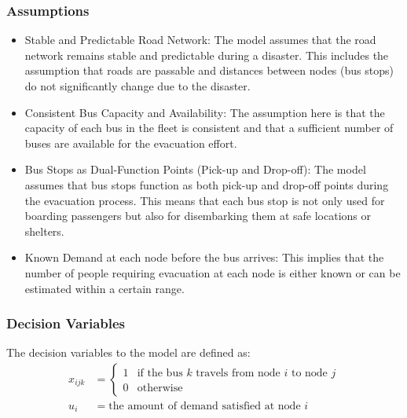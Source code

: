 \documentclass[12pt]{article}
\begin{document}
\subsubsection{Assumptions}
\begin{itemize}
    \item Stable and Predictable Road Network: The model assumes that the road network remains stable and predictable during a disaster. This includes the assumption that roads are passable and distances between nodes (bus stops) do not significantly change due to the disaster.
    \item Consistent Bus Capacity and Availability: The assumption here is that the capacity of each bus in the fleet is consistent and that a sufficient number of buses are available for the evacuation effort.
    \item Bus Stops as Dual-Function Points (Pick-up and Drop-off): The model assumes that bus stops function as both pick-up and drop-off points during the evacuation process. This means that each bus stop is not only used for boarding passengers but also for disembarking them at safe locations or shelters.
    \item Known Demand at each node before the bus arrives: This implies that the number of people requiring evacuation at each node is either known or can be estimated within a certain range.
\end{itemize}



\subsubsection{Decision Variables}
The decision variables to the model are defined as:
\begin{align*}
    x_{ijk} & = \begin{cases}
                    1 & \text{if the bus $k$ travels from node $i$ to node $j$} \\
                    0 & \text{otherwise}
                \end{cases} \\
    u_i     & = \text{the amount of demand satisfied at node $i$}
\end{align*}
\end{document}
